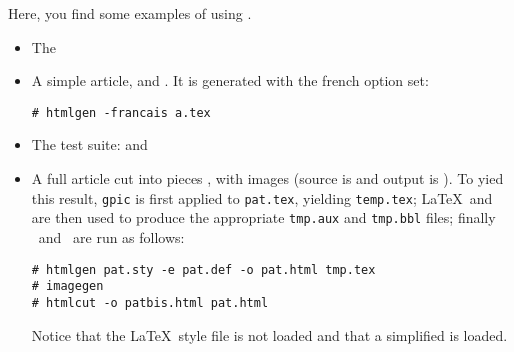 \documentclass{article}
\begin{document}
Here, you find some examples of using \htmlgen.
\begin{itemize}
\item The 
\item A simple article,   and . It is
generated with the french option set:
\begin{verbatim}
# htmlgen -francais a.tex
\end{verbatim}
\item The test suite:  and 
\item A full article cut into pieces , with images (source is 
and output is ). To yied this result, \verb+gpic+ is first
applied to \verb+pat.tex+, yielding \verb+temp.tex+; \LaTeX\ and
\BibTeX are then used to produce the appropriate \verb+tmp.aux+ and
\verb+tmp.bbl+ files; finally \htmlgen\ and \htmlcut\ are run as
follows:
\begin{verbatim}
# htmlgen pat.sty -e pat.def -o pat.html tmp.tex
# imagegen
# htmlcut -o patbis.html pat.html 
\end{verbatim}
Notice that the \LaTeX\ style file  is not loaded and
that a simplified  is loaded.

\end{itemize}
\end{document}
